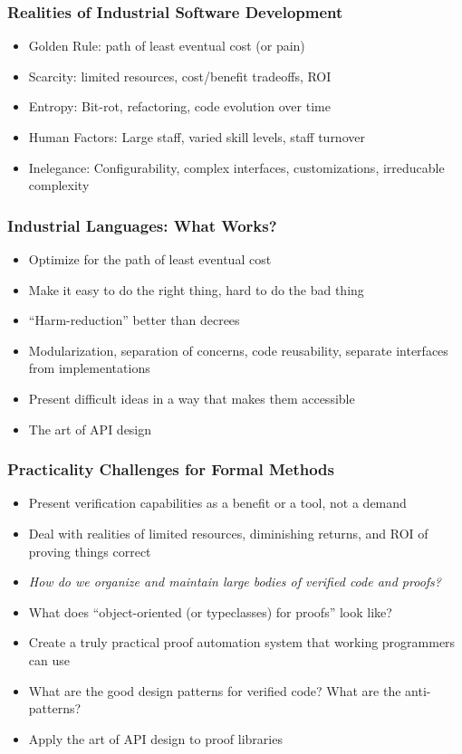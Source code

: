 \documentclass{beamer}
\begin{document}
\begin{frame}
  \frametitle{Realities of Industrial Software Development}
  \begin{itemize}
    \item Golden Rule: path of least eventual cost (or pain)
    \item Scarcity: limited resources, cost/benefit tradeoffs, ROI
    \item Entropy: Bit-rot, refactoring, code evolution over time
    \item Human Factors: Large staff, varied skill levels, staff turnover
    \item Inelegance: Configurability, complex interfaces,
      customizations, irreducable complexity
  \end{itemize}
\end{frame}

\begin{frame}
  \frametitle{Industrial Languages: What Works?}
  \begin{itemize}
    \item Optimize for the path of least eventual cost
    \item Make it easy to do the right thing, hard to do the bad thing
    \item ``Harm-reduction'' better than decrees
    \item Modularization, separation of concerns, code reusability,
      separate interfaces from implementations
    \item Present difficult ideas in a way that makes them accessible
    \item The art of API design
  \end{itemize}
\end{frame}

\begin{frame}
  \frametitle{Practicality Challenges for Formal Methods}
  \begin{itemize}
    \item Present verification capabilities as a benefit or a tool,
      not a demand
    \item Deal with realities of limited resources, diminishing
      returns, and ROI of proving things correct
    \item \emph{How do we organize and maintain large bodies of
      verified code and proofs?}
    \item What does ``object-oriented (or typeclasses) for proofs''
      look like?
    \item Create a truly practical proof automation system that
      working programmers can use
    \item What are the good design patterns for verified code?  What
      are the anti-patterns?
    \item Apply the art of API design to proof libraries
  \end{itemize}
\end{frame}
\end{document}
